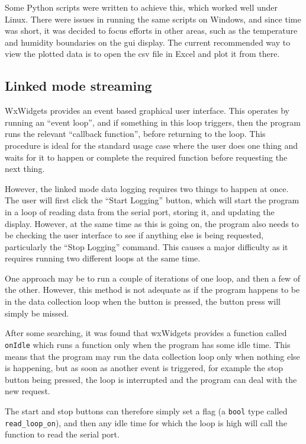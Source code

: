 \documentclass[a4paper,10pt]{article}  %
\begin{document}
Some Python scripts were written to achieve this, which worked well
under Linux. There were issues in running the same scripts on Windows,
and since time was short, it was decided to focus efforts in other
areas, such as the temperature and humidity boundaries on the gui
display. The current recommended way to view the plotted data is to
open the csv file in Excel and plot it from there.

\subsection{Linked mode streaming}

WxWidgets provides an event based graphical user interface. This
operates by running an ``event loop'', and if something in this loop
triggers, then the program runs the relevant ``callback function'',
before returning to the loop. This procedure is ideal for the standard
usage case where the user does one thing and waits for it to happen or
complete the required function before requesting the next thing.

However, the linked mode data logging requires two things to happen at
once. The user will first click the ``Start Logging'' button, which
will start the program in a loop of reading data from the serial port,
storing it, and updating the display. However, at the same time as
this is going on, the program also needs to be checking the user
interface to see if anything else is being requested, particularly the
``Stop Logging'' command. This causes a major difficulty as it
requires running two different loops at the same time.

One approach may be to run a couple of iterations of one loop, and
then a few of the other. However, this method is not adequate as if
the program happens to be in the data collection loop when the button
is pressed, the button press will simply be missed.

After some searching, it was found that wxWidgets provides a function
called \texttt{onIdle} which runs a function only when the program has
some idle time. This means that the program may run the data
collection loop only when nothing else is happening, but as soon as
another event is triggered, for example the stop button being pressed,
the loop is interrupted and the program can deal with the new request.

The start and stop buttons can therefore simply set a flag (a
\texttt{bool} type called \texttt{read\_loop\_on}), and then any idle
time for which the loop is high will call the function to read the
serial port.
\end{document}
